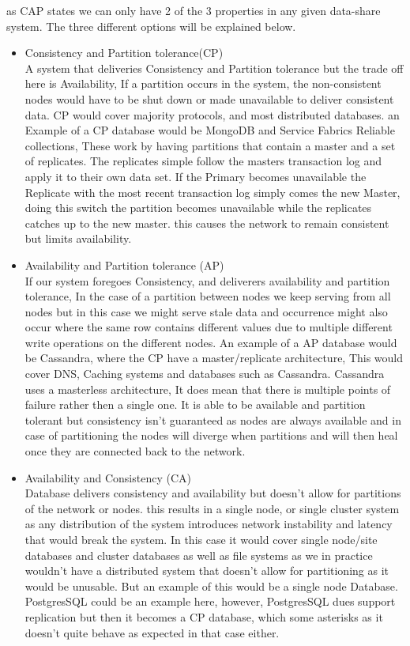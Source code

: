 \documentclass[a4paper,10pt,titlepage]{report}
\begin{document}
as CAP states we can only have 2 of the 3 properties in any given data-share system. The three different options will be explained below.
\begin{itemize}
\item Consistency and Partition tolerance(CP) \\ A system that deliveries Consistency and Partition tolerance but the trade off here is Availability, If a partition occurs in the system, the non-consistent nodes would have to be shut down or made unavailable to deliver consistent data. CP would cover majority protocols, and most distributed databases. an Example of a CP database would be MongoDB and Service Fabrics Reliable collections, These work by having partitions that contain a master and a set of replicates. The replicates simple follow the masters transaction log and apply it to their own data set. If the Primary becomes unavailable the Replicate with the most recent transaction log simply comes the new Master, doing this switch the partition becomes unavailable while the replicates catches up to the new master. this causes the network to remain consistent but limits availability.  \\

\item Availability and Partition tolerance (AP) \\ If our system foregoes Consistency, and deliverers availability and partition tolerance, In the case of a partition between nodes we keep serving from all nodes but in this case we might serve stale data and occurrence might also occur where the same row contains different values due to multiple different write operations on the different nodes. An example of a AP database would be Cassandra, where the CP have a master/replicate architecture, This would cover DNS, Caching systems and databases such as Cassandra. Cassandra uses a masterless architecture, It does mean that there is multiple points of failure rather then a single one. It is able to be available and partition tolerant but consistency isn't guaranteed as nodes are always available and in case of partitioning the nodes will diverge when partitions and will then heal once they are connected back to the network.   \\

\item Availability and Consistency (CA) \\ Database delivers consistency and availability but doesn't allow for partitions of the network or nodes. this results in a single node, or single cluster system as any distribution of the system introduces network instability and latency that would break the system. In this case it would cover single node/site databases and cluster databases as well as file systems as we in practice wouldn't have a distributed system that doesn't allow for partitioning as it would be unusable. But an example of this would be a single node Database. PostgresSQL could be an example here, however, PostgresSQL dues support replication but then it becomes a CP database, which some asterisks\cite{aphyrpostgres} as it doesn't quite behave as expected in that case either. \\
\end{itemize}
\end{document}

